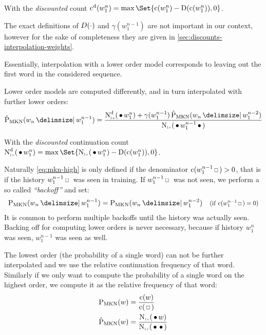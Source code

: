 With the \emph{discounted} count
$\DiscountedCount(w_1^n) = \max\Set{\Count(w_1^n) - \Discount(\Count(w_1^n)), 0}$.

The exact definitions of $D(\cdot)$ and $\gamma(w_1^{n-1})$ are not
important in our context, however for the sake of completeness they are given
in \cref{sec:discounts-interpolation-weights}.

\begin{draft}
Essentially, interpolation with a lower order model corresponds to leaving out
the first word in the considered sequence.
\end{draft}
Lower order models are computed differently, and in turn interpolated with
further lower orders:
\begin{equation}
  \label{eq:mkn-low}
  \ProbMKN*{w_n}{w_1^{n-1}} =
    \frac{\DiscountedCount*(\WSkp w_1^n) + \gamma(w_1^{n-1}) \ProbMKN*{w_n}{w_1^{n-2}}}
         {\ContCountIp(\WSkp w_1^{n-1} \WSkp)} \\
\end{equation}

With the \emph{discounted} continuation count
$\DiscountedCount*(\WSkp w_1^n) = \max\Set{ \ContCountIp(\WSkp w_1^n) - \Discount(\Count(w_1^n)), 0 }$.

Naturally \cref{eq:mkn-high} is only defined if the denominator
$\Count(w_1^{n-1} \Skp) > 0$, that is if the history $w_1^{n-1} \Skp$ was seen
in training.
If $w_1^{n-1} \Skp$ was not seen, we perform a so called \emph{``backoff''}
and set:
\begin{align}
  \label{eq:mkn-backoff}
  \ProbMKN{w_n}{w_1^{n-1}} = \ProbMKN{w_n}{w_1^{n-2}}
      & & \Condition{\Count(w_1^{n-1} \Skp) = 0}
\end{align}
It is common to perform multiple backoffs until the history was actually seen.
Backing off for computing lower orders is never necessary, because
if history $w_1^n$ was seen, $w_1^{n-1}$ was seen as well.

The lowest order (the probability of a single word) can not be further
interpolated and we use the relative continuation frequency of that word.
Similarly if we only want to compute the probability of a single word on the
highest order, we compute it as the relative frequency of that word:
\begin{subequations}
  \label{eq:mkn-lowest}
  \begin{align}
    \ProbMKN {w} &= \frac{\Count(w)}{\Count(\Skp)} \\
    \ProbMKN*{w} &= \frac{\ContCountIp(\WSkp w)}{\ContCountIp(\WSkp \WSkp)}
  \end{align}
\end{subequations}

